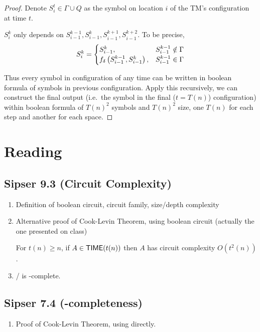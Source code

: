 \documentclass{article}
\begin{document}
\begin{proof}
  Denote \(S_i^t \in \Gamma \cup Q\) as the symbol on location \(i\) of the TM's configuration at time \(t\).

  \begin{claim}
    \(S_i^k\) only depends on \(S_{i-1}^{k-1}, S_{i-1}^k, S_{i-1}^{k+1}, S_{i-1}^{k+2}\). To be precise,
    \[ S_i^k = \begin{cases}
      S_{i-1}^k, & S_{i-1}^{k-1} \notin \Gamma \\
      f_{\delta}\left\lparen S_{i-1}^{k-1}, S_{i-1}^k \right\rparen, & S_{i-1}^{k-1} \in \Gamma
    \end{cases} \]
  \end{claim}

  Thus every symbol in configuration of any time can be written in boolean formula of symbols in previous configuration. Apply this recursively, we can construct the final output (i.e.\ the symbol in the final (\(t = T(n)\)) configuration) within boolean formula of \(T(n)^2\) symbols and \(T(n)^2\) size, one \(T(n)\) for each step and another for each space.
\end{proof}

\section{Reading}

\subsection{Sipser 9.3 (Circuit Complexity)}

\begin{enumerate}
  \item Definition of boolean circuit, circuit family, size/depth complexity
  \item Alternative proof of Cook-Levin Theorem, using boolean circuit (actually the one presented on class)
  \begin{theorem}
    For \(t(n) \geq n\), if \(A \in \text{\sf TIME}(t(n))\) then \(A\) has circuit complexity \(O(t^2(n))\).
  \end{theorem}

  \item {}/ is \NP-complete.
\end{enumerate}

\subsection{Sipser 7.4 (\NP-completeness)}

\begin{enumerate}
  \item Proof of Cook-Levin Theorem, using  directly.
\end{enumerate}
\end{document}
